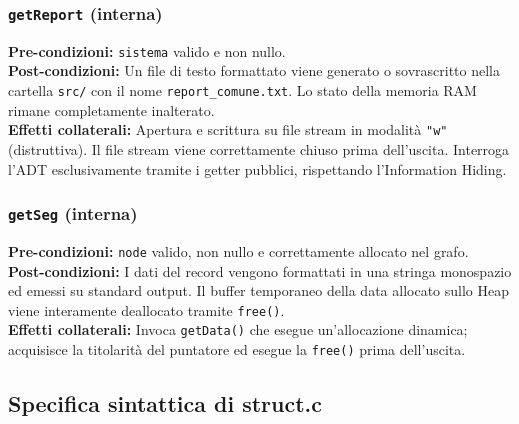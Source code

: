\documentclass[12pt, a4paper]{article}
\begin{document}
\subsubsection{\texttt{getReport} (interna)}
\vspace{3mm}
\begin{specbox}
\textbf{Pre-condizioni:} \texttt{sistema} valido e non nullo. \\
\textbf{Post-condizioni:} Un file di testo formattato viene generato o sovrascritto nella cartella \texttt{src/} con il nome \texttt{report\_comune.txt}. Lo stato della memoria RAM rimane completamente inalterato. \\
\textbf{Effetti collaterali:} Apertura e scrittura su file stream in modalità \texttt{"w"} (distruttiva). Il file stream viene correttamente chiuso prima dell'uscita. Interroga l'ADT esclusivamente tramite i getter pubblici, rispettando l'Information Hiding.
\end{specbox}

\subsubsection{\texttt{getSeg} (interna)}
\vspace{3mm}
\begin{specbox}
\textbf{Pre-condizioni:} \texttt{node} valido, non nullo e correttamente allocato nel grafo. \\
\textbf{Post-condizioni:} I dati del record vengono formattati in una stringa monospazio ed emessi su standard output. Il buffer temporaneo della data allocato sullo Heap viene interamente deallocato tramite \texttt{free()}. \\
\textbf{Effetti collaterali:} Invoca \texttt{getData()} che esegue un'allocazione dinamica; acquisisce la titolarità del puntatore ed esegue la \texttt{free()} prima dell'uscita.
\end{specbox}

\subsection{Specifica sintattica di struct.c}
\end{document}
